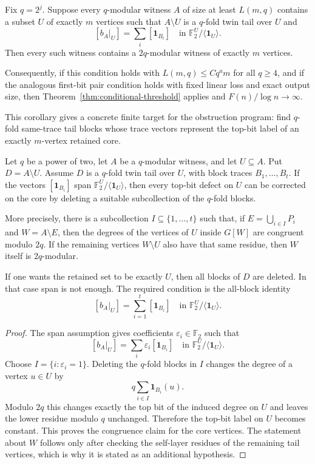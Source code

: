 \documentclass[thmsec,dntnbr,nolinenbrs]{dmgt}
\numberwithin{equation}{section}
\newcommand{\F}{\mathbb{F}}
\newcommand{\one}{\mathbf{1}}
\begin{document}
\begin{corollary}\label{cor:restricted-lifting}
Fix \(q=2^j\).  Suppose every \(q\)-modular witness \(A\) of size at least \(L(m,q)\) contains a subset \(U\) of exactly \(m\) vertices such that \(A\setminus U\) is a \(q\)-fold twin tail over \(U\) and
\[
        [b_A|_U]=\sum_i[\one_{B_i}]
        \quad\text{in }\F_2^U/\langle \one_U\rangle.
\]
Then every such witness contains a \(2q\)-modular witness of exactly \(m\) vertices.

Consequently, if this condition holds with \(L(m,q)\le Cq^a m\) for all \(q\ge 4\), and if the analogous first-bit pair condition holds with fixed linear loss and exact output size, then Theorem~\ref{thm:conditional-threshold} applies and \(F(n)/\log n\to\infty\).
\end{corollary}

This corollary gives a concrete finite target for the obstruction program: find \(q\)-fold same-trace tail blocks whose trace vectors represent the top-bit label of an exactly \(m\)-vertex retained core.

\begin{corollary}\label{cor:span-certificate}
Let \(q\) be a power of two, let \(A\) be a \(q\)-modular witness, and let \(U\subseteq A\).  Put \(D=A\setminus U\).  Assume \(D\) is a \(q\)-fold twin tail over \(U\), with block traces \(B_1,\ldots,B_t\).  If the vectors \([\one_{B_i}]\) span \(\F_2^U/\langle \one_U\rangle\), then every top-bit defect on \(U\) can be corrected on the core by deleting a suitable subcollection of the \(q\)-fold blocks.

More precisely, there is a subcollection \(I\subseteq \{1,\ldots,t\}\) such that, if \(E=\bigcup_{i\in I}P_i\) and \(W=A\setminus E\), then the degrees of the vertices of \(U\) inside \(G[W]\) are congruent modulo \(2q\).  If the remaining vertices \(W\setminus U\) also have that same residue, then \(W\) itself is \(2q\)-modular.

If one wants the retained set to be exactly \(U\), then all blocks of \(D\) are deleted.  In that case span is not enough.  The required condition is the all-block identity
\[
        [b_A|_U]=\sum_{i=1}^t[\one_{B_i}]
        \quad\text{in }\F_2^U/\langle \one_U\rangle.
\]
\end{corollary}

\begin{proof}
The span assumption gives coefficients \(\varepsilon_i\in\F_2\) such that
\[
        [b_A|_U]=\sum_i\varepsilon_i[\one_{B_i}]
        \quad\text{in }\F_2^U/\langle \one_U\rangle.
\]
Choose \(I=\{i:\varepsilon_i=1\}\).  Deleting the \(q\)-fold blocks in \(I\) changes the degree of a vertex \(u\in U\) by
\[
        q\sum_{i\in I}\one_{B_i}(u).
\]
Modulo \(2q\) this changes exactly the top bit of the induced degree on \(U\) and leaves the lower residue modulo \(q\) unchanged.  Therefore the top-bit label on \(U\) becomes constant.  This proves the congruence claim for the core vertices.  The statement about \(W\) follows only after checking the self-layer residues of the remaining tail vertices, which is why it is stated as an additional hypothesis.
\end{proof}
\end{document}
